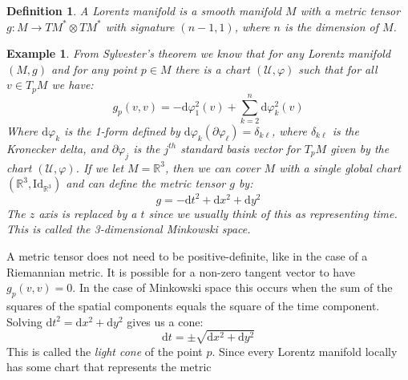 \documentclass{article}
\theoremstyle{plain}
\theoremstyle{thmit}
\theoremstyle{normal}
\newtheorem{example}{Example}[section]
\newtheorem{definition}{Definition}[section]
\begin{document}
        \begin{definition}
            A Lorentz manifold is a smooth manifold $M$ with a metric tensor
            $g:M\rightarrow{T}M^{*}\otimes{T}M^{*}$ with signature $(n-1,1)$,
            where $n$ is the dimension of $M$.
        \end{definition}
        \begin{example}
            From Sylvester's theorem we know that for any Lorentz manifold
            $(M,g)$ and for any point $p\in{M}$ there is a chart
            $(\mathcal{U},\varphi)$ such that for all $v\in{T}_{p}M$ we have:
            \begin{equation}
                g_{p}(v,v)=-\textrm{d}\varphi_{1}^{2}(v)+
                    \sum_{k=2}^{n}\textrm{d}\varphi_{k}^{2}(v)
            \end{equation}
            Where $\textrm{d}\varphi_{k}$ is the 1-form defined by
            $\textrm{d}\varphi_{k}(\partial\varphi_{\ell})=\delta_{k\ell}$,
            where $\delta_{k\ell}$ is the Kronecker delta, and
            $\partial\varphi_{j}$ is the $j^{th}$ standard basis vector for
            $T_{p}M$ given by the chart $(\mathcal{U},\varphi)$. If we let
            $M=\mathbb{R}^{3}$, then we can cover $M$ with a single global chart
            $(\mathbb{R}^{3},\textrm{Id}_{\mathbb{R}^{3}})$ and can define the
            metric tensor $g$ by:
            \begin{equation}
                g=-\textrm{d}t^{2}+\textrm{d}x^{2}+\textrm{d}y^{2}
            \end{equation}
            The $z$ axis is replaced by a $t$ since we usually think of this as
            representing time. This is called the 3-dimensional Minkowski space.
        \end{example}
        A metric tensor does not need to be positive-definite, like in the case
        of a Riemannian metric. It is possible for a non-zero tangent vector to
        have $g_{p}(v,v)=0$. In the case of Minkowski space this occurs when
        the sum of the squares of the spatial components equals the square of
        the time component. Solving
        $\textrm{d}t^{2}=\textrm{d}x^{2}+\textrm{d}y^{2}$ gives us a cone:
        \begin{equation}
            \textrm{d}t=\pm\sqrt{\textrm{d}x^{2}+\textrm{d}y^{2}}
        \end{equation}
        This is called the \textit{light cone} of the point $p$. Since every
        Lorentz manifold locally has some chart that represents the metric
\end{document}
